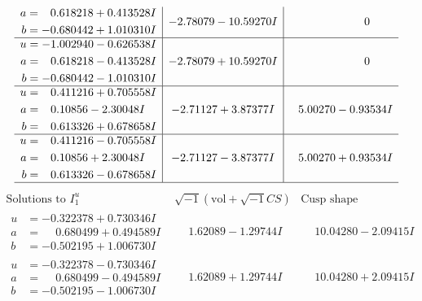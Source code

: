 \documentclass[1p]{elsarticle_modified}
\theoremstyle{definition}
\newcommand{\I}{\sqrt{-1}}
\begin{document}
$$\begin{array}{c|c|c}
\begin{aligned}
a &= \phantom{-}0.618218 + 0.413528 I \\
b &= -0.680442 + 1.010310 I\end{aligned}
 & -2.78079 - 10.59270 I & \phantom{-0.000000 } 0 \\ \hline\begin{aligned}
u &= -1.002940 - 0.626538 I \\
a &= \phantom{-}0.618218 - 0.413528 I \\
b &= -0.680442 - 1.010310 I\end{aligned}
 & -2.78079 + 10.59270 I & \phantom{-0.000000 } 0 \\ \hline\begin{aligned}
u &= \phantom{-}0.411216 + 0.705558 I \\
a &= \phantom{-}0.10856 - 2.30048 I \\
b &= \phantom{-}0.613326 + 0.678658 I\end{aligned}
 & -2.71127 + 3.87377 I & \phantom{-}5.00270 - 0.93534 I \\ \hline\begin{aligned}
u &= \phantom{-}0.411216 - 0.705558 I \\
a &= \phantom{-}0.10856 + 2.30048 I \\
b &= \phantom{-}0.613326 - 0.678658 I\end{aligned}
 & -2.71127 - 3.87377 I & \phantom{-}5.00270 + 0.93534 I\\
 \hline 
 \end{array}$$\newpage$$\begin{array}{c|c|c}  
\text{Solutions to }I^u_{1}& \I (\text{vol} + \sqrt{-1}CS) & \text{Cusp shape}\\
 \hline 
\begin{aligned}
u &= -0.322378 + 0.730346 I \\
a &= \phantom{-}0.680499 + 0.494589 I \\
b &= -0.502195 + 1.006730 I\end{aligned}
 & \phantom{-}1.62089 - 1.29744 I & \phantom{-}10.04280 - 2.09415 I \\ \hline\begin{aligned}
u &= -0.322378 - 0.730346 I \\
a &= \phantom{-}0.680499 - 0.494589 I \\
b &= -0.502195 - 1.006730 I\end{aligned}
 & \phantom{-}1.62089 + 1.29744 I & \phantom{-}10.04280 + 2.09415 I \\ \hline\begin{aligned}

\end{aligned}
\end{array}$$
\end{document}
